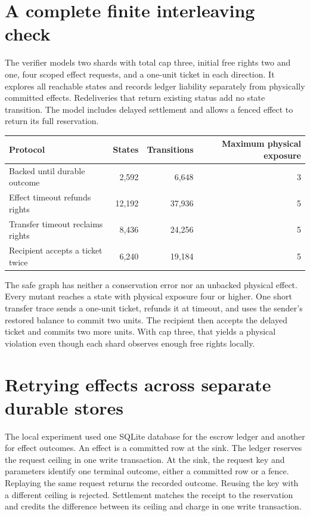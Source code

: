 \documentclass[11pt]{article}
\begin{document}
\section{A complete finite interleaving check}
The verifier models two shards with total cap three, initial
free rights two and one, four scoped effect requests, and a
one-unit ticket in each direction. It explores all reachable
states and records ledger liability separately from physically
committed effects. Redeliveries that return existing status add
no state transition. The model includes delayed settlement and
allows a fenced effect to return its full reservation.
\begin{center}
\begin{tabular}{lrrr}
\toprule
Protocol & States & Transitions & Maximum physical exposure \\
\midrule
Backed until durable outcome & 2,592 & 6,648 & 3 \\
Effect timeout refunds rights & 12,192 & 37,936 & 5 \\
Transfer timeout reclaims rights & 8,436 & 24,256 & 5 \\
Recipient accepts a ticket twice & 6,240 & 19,184 & 5 \\
\bottomrule
\end{tabular}
\end{center}
The safe graph has neither a conservation error nor an unbacked
physical effect. Every mutant reaches a state with physical
exposure four or higher. One short transfer trace sends a
one-unit ticket, refunds it at timeout, and uses the sender's
restored balance to commit two units. The recipient then accepts
the delayed ticket and commits two more units. With cap three,
that yields a physical violation even though each shard observes
enough free rights locally.

\section{Retrying effects across separate durable stores}
The local experiment used one SQLite database for the escrow
ledger and another for effect outcomes. An effect is a committed
row at the sink. The ledger reserves the request ceiling in one
write transaction. At the sink, the request key and parameters
identify one terminal outcome, either a committed row or a fence.
Replaying the same request returns the recorded outcome. Reusing
the key with a different ceiling is rejected. Settlement matches
the receipt to the reservation and credits the difference between
its ceiling and charge in one write transaction.
\end{document}
